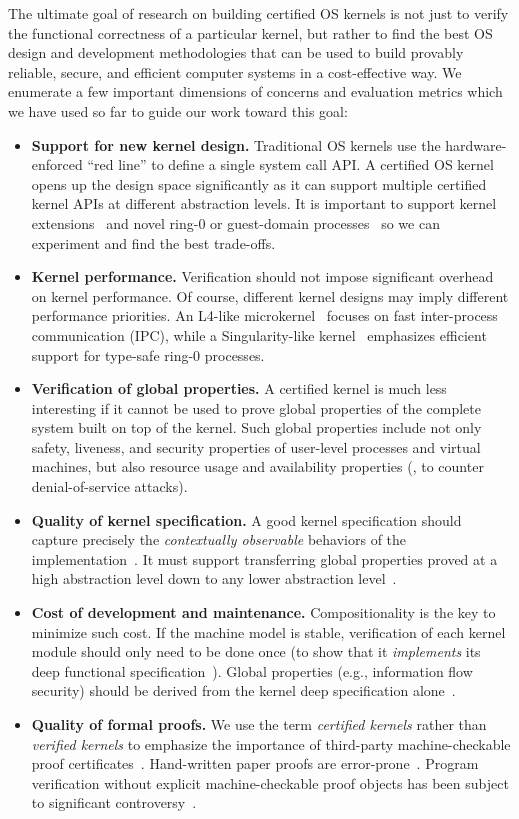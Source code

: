 The ultimate goal of research on building certified OS kernels is
not just to verify the functional correctness of a particular kernel,
but rather to find the best OS design and development methodologies that can be used to build provably reliable, secure, and efficient
computer systems in a cost-effective way. We enumerate a few important
dimensions of concerns and evaluation metrics which we have used so
far to guide our work toward this goal:
\begin{itemize}[leftmargin=*,itemsep=0pt] 
\item {\bf Support for new kernel design.}  Traditional OS kernels use
  the hardware-enforced ``red line'' to define a single system call
  API. A certified OS kernel opens up the design space significantly as
  it can support multiple certified kernel APIs at different
  abstraction levels. It is important to support kernel
  extensions~\cite{bershad95,engler95,unikernel13} and novel ring-0
  or guest-domain processes~\cite{hunt07,dune12} so we can experiment
  and find the best trade-offs.
\item {\bf Kernel performance.} Verification should not
  impose significant overhead on kernel performance. Of course,
  different kernel designs may imply different performance
  priorities.  An L4-like microkernel~\cite{liedtke95} focuses on
  fast inter-process communication (IPC), while a
  Singularity-like kernel~\cite{hunt07} emphasizes efficient
  support for type-safe ring-0 processes.
\item {\bf Verification of global properties.}
  A certified kernel is much less interesting if it cannot be
  used to prove global properties of the complete system built on top
  of the kernel.  Such global
  properties include not only safety, liveness, and security properties
  of user-level processes and virtual machines, but also resource usage
  and availability properties (\eg, to counter denial-of-service attacks).
\item {\bf Quality of kernel specification.}  A good kernel
  specification should capture precisely the {\em contextually observable}
  behaviors of the implementation~\cite{dscal15}. It must
  support transferring global properties proved at a high abstraction
  level down to any lower abstraction level~\cite{costanzo16}.
\item {\bf Cost of development and maintenance.} Compositionality
  is the key to minimize such cost. If the machine model is stable,
  verification of each kernel module should only need
  to be done once (to show that it {\em implements} its deep
  functional specification~\cite{dscal15}). Global properties (e.g., 
  information flow security) should
  be derived from the kernel deep specification alone~\cite{costanzo16}. 
\item {\bf Quality of formal proofs.} We use the term {\em certified
  kernels} rather than {\em verified kernels} to emphasize the
  importance of third-party machine-checkable proof
  certificates~\cite{shao10}. Hand-written paper proofs are
  error-prone~\cite{findler12}. Program verification without explicit
  machine-checkable proof objects has been subject to
  significant controversy~\cite{demillo77}.
\end{itemize}
